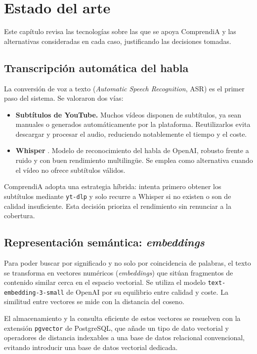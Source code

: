 \chapter{Estado del arte}
\label{cap:estado-arte}

Este capítulo revisa las tecnologías sobre las que se apoya ComprendiA y las alternativas
consideradas en cada caso, justificando las decisiones tomadas.

\section{Transcripción automática del habla}

La conversión de voz a texto (\textit{Automatic Speech Recognition}, ASR) es el primer paso del
sistema. Se valoraron dos vías:

\begin{itemize}
  \item \textbf{Subtítulos de YouTube.} Muchos vídeos disponen de subtítulos, ya sean manuales o
        generados automáticamente por la plataforma. Reutilizarlos evita descargar y procesar el
        audio, reduciendo notablemente el tiempo y el coste.
  \item \textbf{Whisper} \cite{radford2022whisper}. Modelo de reconocimiento del habla de OpenAI,
        robusto frente a ruido y con buen rendimiento multilingüe. Se emplea como alternativa
        cuando el vídeo no ofrece subtítulos válidos.
\end{itemize}

ComprendiA adopta una estrategia híbrida: intenta primero obtener los subtítulos mediante
\texttt{yt-dlp} y solo recurre a Whisper si no existen o son de calidad insuficiente. Esta
decisión prioriza el rendimiento sin renunciar a la cobertura.

\section{Representación semántica: \textit{embeddings}}

Para poder buscar por significado y no solo por coincidencia de palabras, el texto se
transforma en vectores numéricos (\textit{embeddings}) que sitúan fragmentos de contenido
similar cerca en el espacio vectorial. Se utiliza el modelo \texttt{text-embedding-3-small} de
OpenAI por su equilibrio entre calidad y coste. La similitud entre vectores se mide con la
distancia del coseno.

El almacenamiento y la consulta eficiente de estos vectores se resuelven con la extensión
\texttt{pgvector} \cite{pgvector} de PostgreSQL, que añade un tipo de dato vectorial y
operadores de distancia indexables a una base de datos relacional convencional, evitando
introducir una base de datos vectorial dedicada.

